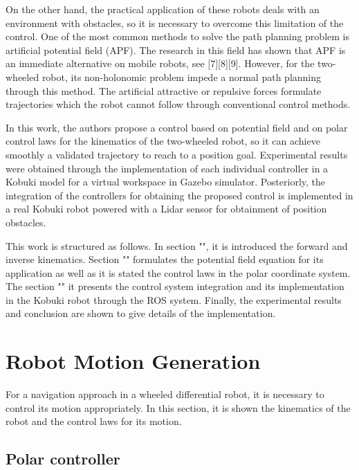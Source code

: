 \documentclass[conference]{IEEEtran}
\begin{document}
On the other hand, the practical application of these robots deals with an environment with obstacles, so it is necessary to overcome this limitation of the control.  One of the most common methods to solve the path planning problem is artificial potential field (APF). The research in this field has shown that APF is an immediate alternative on mobile robots, see [7][8][9]. However, for the two-wheeled robot, its non-holonomic problem impede a normal path planning through this method. The artificial attractive or repulsive forces formulate trajectories which the robot cannot follow through conventional control methods. 

In this work, the authors propose a control based on potential field and on polar control laws for the kinematics of the two-wheeled robot, so it can achieve smoothly a validated trajectory to reach to a position goal. Experimental results were obtained through the implementation of each individual controller in a Kobuki model for a virtual workspace in Gazebo simulator. Posteriorly, the integration of the controllers for obtaining the proposed control is implemented in a real Kobuki robot powered with a Lidar sensor for obtainment of position obstacles. 
 
This work is structured as follows. In section "", it is introduced the forward and inverse kinematics. Section "" formulates the potential field equation for its application as well as it is stated the control laws in the polar coordinate system. The section "" it presents the control system integration and its implementation in the Kobuki robot through the ROS system. Finally, the experimental results and conclusion are shown to give details of the implementation.

\section{Robot Motion Generation}
\label{sec:robot_motion}
For a navigation approach in a wheeled differential robot, it is necessary to control its motion appropriately. In this section, it is shown the kinematics of the robot and the control laws for its motion.

\subsection{Polar controller}
\end{document}
